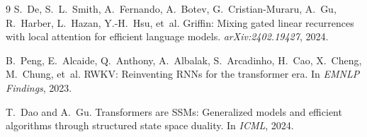 \documentclass[11pt,a4paper]{article}
\begin{document}
\begin{thebibliography}{9}
S.~De, S.~L.~Smith, A.~Fernando, A.~Botev, G.~Cristian-Muraru,
A.~Gu, R.~Harber, L.~Hazan, Y.-H.~Hsu, et~al.
Griffin: Mixing gated linear recurrences with local attention for
efficient language models.
\emph{arXiv:2402.19427}, 2024.

B.~Peng, E.~Alcaide, Q.~Anthony, A.~Albalak, S.~Arcadinho,
H.~Cao, X.~Cheng, M.~Chung, et~al.
RWKV: Reinventing RNNs for the transformer era.
In \emph{EMNLP Findings}, 2023.

T.~Dao and A.~Gu.
Transformers are SSMs: Generalized models and efficient algorithms
through structured state space duality.
In \emph{ICML}, 2024.

\end{thebibliography}
\end{document}
